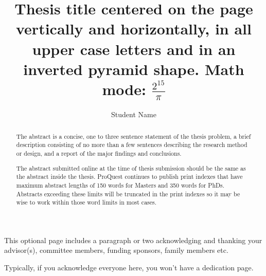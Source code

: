 \documentclass[12pt]{mines-thesis}
\begin{document}
\autotitle %
\title{Thesis title centered on the page vertically and horizontally, in all upper case letters and in an inverted pyramid shape. Math mode: $\frac{2^{15}}{\pi}$
}
%	
	
\author{Student Name}  %
	
	
\begin{abstract}
	The abstract is a concise, one to three sentence statement of the thesis problem, a brief description consisting of no more than a few sentences describing the research method or design, and a report of the major findings and conclusions.
			
	The abstract submitted online at the time of thesis submission should be the same as the abstract inside the thesis. ProQuest continues to publish print indexes that have maximum abstract lengths of 150 words for Masters and 350 words for PhDs. Abstracts exceeding these limits will be truncated in the print indexes so it may be wise to work within those word limits in most cases.
\end{abstract}

\begin{acknowledgment}
	This optional page includes a paragraph or two acknowledging and thanking your
	advisor(s), committee members, funding sponsors, family members etc.
			
	Typically, if you acknowledge everyone here, you won’t have a dedication page.
\end{acknowledgment}
\end{document}
